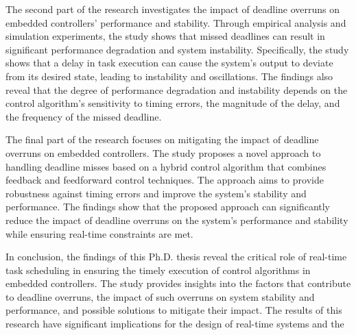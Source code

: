 The second part of the research investigates the impact of deadline overruns on embedded controllers' performance and stability.
Through empirical analysis and simulation experiments, the study shows that missed deadlines can result in significant performance degradation and system instability.
Specifically, the study shows that a delay in task execution can cause the system's output to deviate from its desired state, leading to instability and oscillations.
The findings also reveal that the degree of performance degradation and instability depends on the control algorithm's sensitivity to timing errors, the magnitude of the delay, and the frequency of the missed deadline.

The final part of the research focuses on mitigating the impact of deadline overruns on embedded controllers.
The study proposes a novel approach to handling deadline misses based on a hybrid control algorithm that combines feedback and feedforward control techniques.
The approach aims to provide robustness against timing errors and improve the system's stability and performance.
The findings show that the proposed approach can significantly reduce the impact of deadline overruns on the system's performance and stability while ensuring real-time constraints are met.

In conclusion, the findings of this Ph.D. thesis reveal the critical role of real-time task scheduling in ensuring the timely execution of control algorithms in embedded controllers.
The study provides insights into the factors that contribute to deadline overruns, the impact of such overruns on system stability and performance, and possible solutions to mitigate their impact.
The results of this research have significant implications for the design of real-time systems and the


